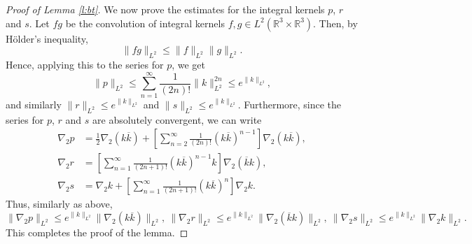 \documentclass[11pt,a4paper,draft,DIV11]{scrartcl}	%
\newcommand{\Rbb}{\mathbb{R}}		%
\begin{document}
\begin{proof}[Proof of Lemma \ref{l:bt}]
  We now prove the estimates for the integral kernels $p$, $r$ and $s$. 
  Let $fg$ be the convolution of integral kernels $f, g \in L^2(\Rbb^3\times\Rbb^3)$. Then, by H\"older's inequality,
  \[
    \| f g \|_{L^2} \le \| f \|_{L^2} \| g \|_{L^2}.
  \]
  Hence, applying this to the series for $p$, we get
  \[
    \| p \|_{L^2} \le \sum_{n=1}^\infty \frac{1}{(2n)!} \| k \|_{L^2}^{2n} \le
    e^{\| k \|_{L^2}},
  \]
  and similarly $\| r \|_{L^2} \le e^{\| k \|_{L^2}}$ and $\| s \|_{L^2} \le
  e^{\| k \|_{L^2}}$. Furthermore, since the series for $p$, $r$ and $s$ are
  absolutely convergent, we can write
  \begin{align*}
    \nabla_2 p & = \frac{1}{2} \nabla_2 (k \overline{k}) + \left[
    \sum_{n=2}^\infty \frac{1}{(2n)!} (k \overline{k})^{n-1} \right]
    \nabla_2 (k \overline{k}) , \\
    \nabla_2 r & = \left[ \sum_{n=1}^\infty \frac{1}{(2n+1)!} (k
    \overline{k})^{n-1} k \right] \nabla_2 (\overline{k} k), \\
    \nabla_2 s & = \nabla_2 k + \left[ \sum_{n=1}^\infty \frac{1}{(2n+1)!}
    (k \overline{k})^n \right] \nabla_2 k.
  \end{align*}
  Thus, similarly as above,
  \begin{displaymath}
    \| \nabla_2 p \|_{L^2} \le e^{\| k \|_{L^2}} \| \nabla_2 (k
    \overline{k}) \|_{L^2},\  
    \| \nabla_2 r \|_{L^2} \le e^{\| k \|_{L^2}} \| \nabla_2
    (\overline{k} k) \|_{L^2},\ 
    \| \nabla_2 s \|_{L^2} \le e^{\| k \|_{L^2}} \| \nabla_2 k
    \|_{L^2}.
  \end{displaymath}
This completes the proof of the lemma.
\end{proof}
\end{document}
